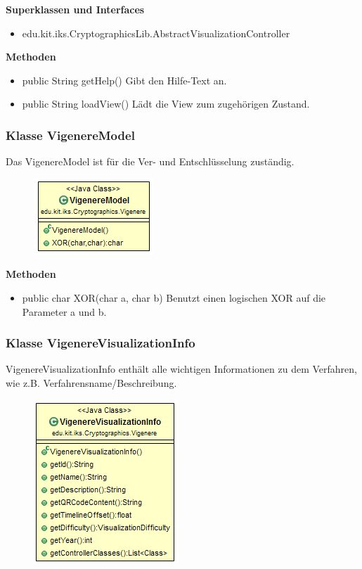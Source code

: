 \documentclass{article}
\begin{document}
      \textbf{Superklassen und Interfaces}
      \begin{itemize}
        \item edu.kit.iks.CryptographicsLib.AbstractVisualizationController
      \end{itemize}
      
      \textbf{Methoden}
      \begin{itemize}
        \item public String getHelp() \newline
        Gibt den Hilfe-Text an.
        \item public String loadView() \newline
        Lädt die View zum zugehörigen Zustand.
      \end{itemize}

    \subsubsection{Klasse VigenereModel}
      Das VigenereModel ist für die Ver- und Entschlüsselung zuständig.
      \begin{figure}[H]
        \centering
        \includegraphics{resources/edu-kit-iks-Cryptographics-Vigenere-VigenereModel}
      \end{figure}
      
      \textbf{Methoden}
      \begin{itemize}
        \item public char XOR(char a, char b) \newline
        Benutzt einen logischen XOR auf die Parameter a und b.
      \end{itemize}

    \subsubsection{Klasse VigenereVisualizationInfo}
      VigenereVisualizationInfo enthält alle wichtigen Informationen zu dem Verfahren, wie z.B. Verfahrensname/Beschreibung.
      \begin{figure}[H]
        \centering
        \includegraphics{resources/edu-kit-iks-Cryptographics-Vigenere-VisualizationInfo}
      \end{figure}
\end{document}
